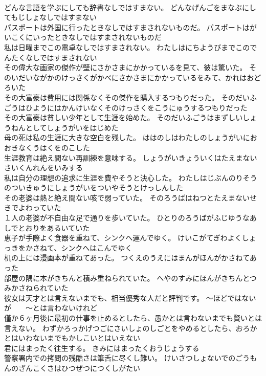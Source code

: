 \documentclass[8pt]{extreport}
\begin{document}
\begin{CJK}{UTF8}{min}
\\	どんな言語を学ぶにしても辞書なしではすまない。	どんなげんごをまなぶにしてもじしょなしではすまない 
\\	パスポートは外国に行ったときなしではすまされないものだ。	パスポートはがいこくにいったときなしではすまされないものだ 
\\	私は日曜までこの電卓なしではすまされない。	わたしはにちようびまでこのでんたくなしではすまされない 
\\	その偉大な画家の傑作が壁にさかさまにかかっているを見て、彼は驚いた。	そのいだいながかのけっさくがかべにさかさまにかかっているをみて、かれはおどろいた 
\\	その大富豪は費用には関係なくその傑作を購入するつもりだった。	そのだいふごうはひようにはかんけいなくそのけっさくをこうにゅうするつもりだった 
\\	その大富豪は貧しい少年として生涯を始めた。	そのだいふごうはまずしいしょうねんとしてしょうがいをはじめた 
\\	母の死は私の生涯に大きな空白を残した。	ははのしはわたしのしょうがいにおおきなくうはくをのこした 
\\	生涯教育は絶え間ない再訓練を意味する。	しょうがいきょういくはたえまないさいくんれんをいみする 
\\	私は自分の理想の追求に生涯を費やそうと決心した。	わたしはじぶんのりそうのついきゅうにしょうがいをついやそうとけっしんした 
\\	その老婆は熱と絶え間ない咳で弱っていた。	そのろうばはねつとたえまないせきでよわっていた 
\\	１人の老婆が不自由な足で通りを歩いていた。	ひとりのろうばがふじゆうなあしでとおりをあるいていた 
\\	恵子が手際よく食器を重ねて、シンクへ運んでゆく。	けいこがてぎわよくしょっきをかさねて、シンクへはこんでゆく 
\\	机の上には漫画本が重ねてあった。	つくえのうえにはまんがほんがかさねてあった 
\\	部屋の隅に本がきちんと積み重ねられていた。	へやのすみにほんがきちんとつみかさねられていた 
\\	彼女は天才とは言えないまでも、相当優秀な人だと評判です。	～ほどではないが　　～とは言わないけれど
\\	僅か６ヶ月後に最初の仕事を止めるとしたら、愚かとは言わないまでも賢いとは言えない。	わずかろっかげつごにさいしょのしごとをやめるとしたら、おろかとはいわないまでもかしこいとはいえない 
\\	君にはまったく往生する。	きみにはまったくおうじょうする 
\\	警察署内での拷問の残酷さは筆舌に尽くし難い。	けいさつしょないでのごうもんのざんこくさはひつぜつにつくしがたい 

\end{CJK}
\end{document}
